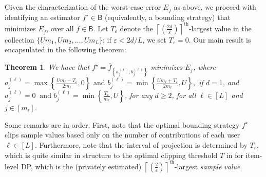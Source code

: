 \documentclass[conference,letterpaper]{IEEEtran}
\newtheorem{theorem}{Theorem}[section]
\theoremstyle{remark}
\theoremstyle{definition}
\begin{document}
Given the characterization of the worst-case error $E_{\overline{f}}$ as above, we proceed with identifying an estimator $f^\star \in \mathsf{B}$ (equivalently, a bounding strategy) that minimizes $E_{\overline{f}}$, over all $\overline{f}\in \mathsf{B}$. Let $T_\varepsilon$ denote the $\left \lceil \left(\frac{2d}{\varepsilon}\right)\right \rceil^{\text{th}}$-largest value in the collection $\{Um_1,Um_2,\ldots,Um_L\}$; if $\varepsilon<2d/L$, we set $T_\varepsilon = 0$. Our main result is encapsulated in the following theorem:
\begin{theorem}
	\label{thm:opt}
	We have that $f^\star = \overline{f}_{\left\{a_j^{(\ell)},b_j^{(\ell)}\right\}}$ minimizes $E_{\overline{f}}$, where
	$
	a_j^{(\ell)} = \max\left\{\frac{Um_\ell-T_\varepsilon}{2m_\ell},0\right\}\text{ and } b_j^{(\ell)} = \min\left\{\frac{Um_\ell+T_\varepsilon}{2m_\ell},U\right\},
	$
	if $d=1$, and $
	a_j^{(\ell)} = 0\ \text{ and } b_j^{(\ell)} =\min\left\{\frac{T_\varepsilon}{m_\ell},U\right\}
	$, for any $d\geq 2$, for all $\ell\in [L]$ and $j\in [m_\ell]$.
\end{theorem}
Some remarks are in order. First, note that the optimal bounding strategy $f^\star$ clips sample values based only on the number of contributions of each user $\ell\in [L]$. Furthermore, note that the interval of projection is determined by $T_\varepsilon$, which is quite similar in structure to the optimal clipping threshold $T$ in \cite{amin} for item-level DP, which is the (privately estimated) $\left \lceil \left(\frac{2}{\varepsilon}\right)\right \rceil^{\text{th}}$-largest \emph{sample value}.
\end{document}
